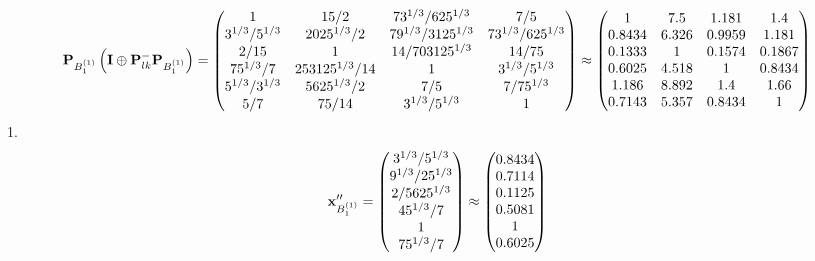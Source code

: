 \documentclass[10pt,a4paper]{article}
\begin{document}
	\[
		\bold{P}_{B_1^{(1)}}\left(\bold{I} \oplus \bold{P}_{lk}^{-}\bold{P}_{B_1^{(1)}}\right) = 
		\begin{pmatrix}
			{1}{} & {{15}} / {{2}} & {{7}{3^ {1 / 3}}} / {{625^ {1 / 3}}} & {{7}} / {{5}} \\
			{{3^ {1 / 3}}} / {{5^ {1 / 3}}} & {{2025^ {1 / 3}}} / {{2}} & {{7}{9^ {1 / 3}}} / {{3125^ {1 / 3}}} & {{7}{3^ {1 / 3}}} / {{625^ {1 / 3}}} \\
			{{2}} / {{15}} & {1}{} & {{14}} / {{703125^ {1 / 3}}} & {{14}} / {{75}} \\
			{{75^ {1 / 3}}} / {{7}} & {{253125^ {1 / 3}}} / {{14}} & {1}{} & {{3^ {1 / 3}}} / {{5^ {1 / 3}}} \\
			{{5^ {1 / 3}}} / {{3^ {1 / 3}}} & {{5625^ {1 / 3}}} / {{2}} & {{7}} / {{5}} & {{7}} / {{75^ {1 / 3}}} \\
			{{5}} / {{7}} & {{75}} / {{14}} & {{3^ {1 / 3}}} / {{5^ {1 / 3}}} & {1}{} \\
		\end{pmatrix}
		\approx
		\begin{pmatrix}
			1        & 7.5      & 1.181    & 1.4      \\
			0.8434   & 6.326    & 0.9959   & 1.181    \\
			0.1333   & 1        & 0.1574   & 0.1867   \\
			0.6025   & 4.518    & 1        & 0.8434   \\
			1.186    & 8.892    & 1.4      & 1.66     \\
			0.7143   & 5.357    & 0.8434   & 1        \\
		\end{pmatrix}
	\]
	1.
	\[
		\bold{x}''_{B_1^{(1)}} = 
		\begin{pmatrix}
			{{3^ {1 / 3}}} / {{5^ {1 / 3}}} \\
			{{9^ {1 / 3}}} / {{25^ {1 / 3}}} \\
			{{2}} / {{5625^ {1 / 3}}} \\
			{{45^ {1 / 3}}} / {{7}} \\
			{1}{} \\
			{{75^ {1 / 3}}} / {{7}} \\
		\end{pmatrix}
		\approx
		\begin{pmatrix}
			0.8434   \\
			0.7114   \\
			0.1125   \\
			0.5081   \\
			1        \\
			0.6025   \\
		\end{pmatrix}
	\]
\end{document}

